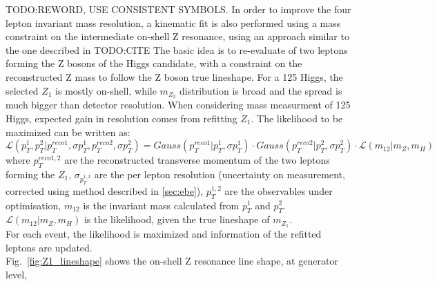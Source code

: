 TODO:REWORD, USE CONSISTENT SYMBOLS.
In order to improve the four lepton invariant mass resolution, a kinematic fit is also performed
using a mass constraint on the intermediate on-shell Z resonance, using an approach similar to the one
described in TODO:CITE
The basic idea is to re-evaluate \pT of two leptons forming 
the Z bosons of the Higgs candidate, with a constraint on the reconstructed Z mass to follow 
the Z boson true lineshape. For a 125 \GeV Higgs, the selected $Z_{1}$ is mostly on-shell, 
while $m_{Z_{2}}$ distribution is broad and the spread is much bigger than detector resolution. 
When considering mass measurment of 125 \GeV Higgs, expected gain in resolution comes from refitting $Z_{1}$.
The likelihood to be maximized can be written as:
\[
\mathcal{L}(p_{T}^{1} , p_{T}^{2}|p_{T}^{reco1}, \sigma p_{T}^{1},p_{T}^{reco2}, \sigma p_{T}^{2}) = 
Gauss(p_{T}^{reco1}|p_{T}^{1}, \sigma p_{T}^{1}) \cdot Gauss(p_{T}^{reco2}|p_{T}^{2}, \sigma p_{T}^{2}) 
\cdot \mathcal{L}(m_{12}|m_{Z},m_{H})
\]
where $p_{T}^{reco1,2}$ are the reconstructed transverse momentum of the two leptons forming the $Z_{1}$,
$\sigma_{p_{T}^{1,2}}$ are the per lepton resolution (uncertainty on \pT measurement, corrected using 
method described in \ref{sec:ebe}), $p_{T}^{1,2}$ are the observables under optimisation,
$m_{12}$ is the invariant mass calculated from $p_{T}^{1}$ and $p_{T}^{2}$. $\mathcal{L}(m_{12}|m_{Z},m_{H})$
is the likelihood, given the true lineshape of $m_{Z_{1}}$. \\
For each event, the likelihood is maximized and \pT information of the refitted leptons are updated. \\
Fig.~\ref{fig:Z1_lineshape} shows the on-shell Z resonance line shape, at generator level, 
